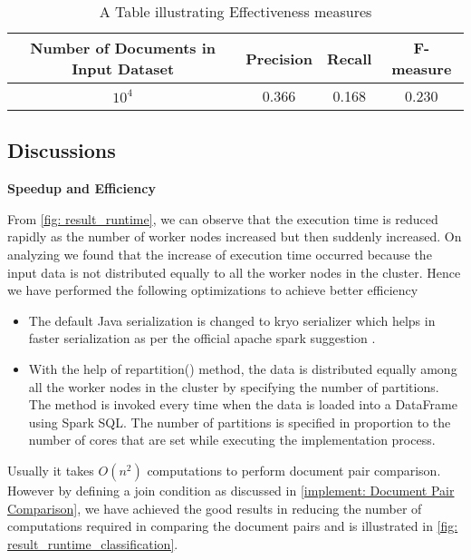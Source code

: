 \begin{table}[htbp]
	\centering
		\begin{tabular}{cccc}\toprule
		Number of Documents in Input Dataset & Precision & Recall & F-measure\\\midrule
		
        \(10^4\)  &  0.366 & 0.168 & 0.230 \\\bottomrule
		\end{tabular}
	\caption{A Table illustrating Effectiveness measures}
	\label{tab:fmeasure}
\end{table}

\subsection{Discussions}
\label{section: Discussions}

\textbf{Speedup and Efficiency}

\par From \ref{fig: result_runtime}, we can observe that the execution time is reduced rapidly as the number of worker nodes increased but then suddenly increased. On analyzing we found that the increase of execution time occurred because the input data is not distributed equally to all the worker nodes in the cluster. Hence we have performed the following optimizations to achieve better efficiency

\begin{itemize}
\item The default Java serialization is changed to kryo serializer which helps in faster serialization as per the official apache spark suggestion \cite{spark:website}.
\item With the help of repartition() method, the data is distributed equally among all the worker nodes in the cluster by specifying the number of partitions. The method is invoked every time when the data is loaded into a DataFrame using Spark SQL. The number of partitions is specified in proportion to the number of cores that are set while executing the implementation process.
\end{itemize}

\par Usually it takes \(O(n^2)\) computations to perform document pair comparison. However by defining a join condition as discussed in \ref{implement: Document Pair Comparison}, we have achieved the good results in reducing the number of computations required in comparing the document pairs and is illustrated in \ref{fig: result_runtime_classification}.

